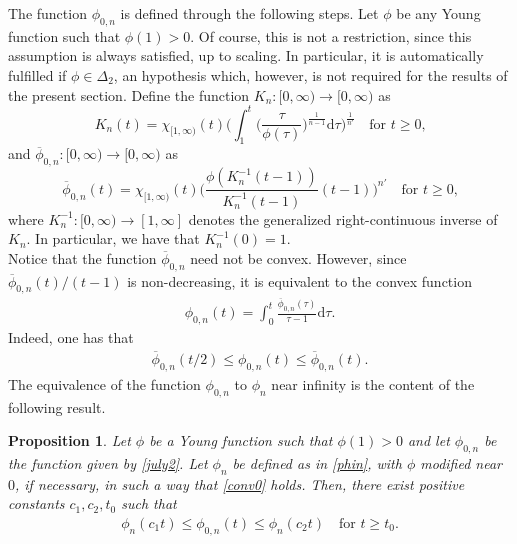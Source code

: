 \documentclass[leqno,11pt]{amsart}%
\numberwithin{equation}{section}
\def\d{\mathrm{d}}
\newtheorem{prop}[thm]{Proposition}
\theoremstyle{definition}
\numberwithin{equation}{section}
\begin{document}
The function $\phi_{0,n}$ is  defined through the following steps.
Let $\phi$ be any  Young function such that $\phi (1)>0$. Of course, this is not a restriction, since this assumption is always satisfied, up to scaling. In particular, it is automatically fulfilled if $\phi \in\Delta_2$, an hypothesis which, however, is not required for the results of the present section.
Define the function $K_n: [0, \infty) \to [0, \infty)$ as 
\begin{equation}
    \label{K}
    K_n(t)= \chi_{[1, \infty)}(t)\bigg(\int_1^t\Big(\frac \tau{\phi (\tau)}\Big)^{\frac{1}{n-1}}\d \tau\bigg)^{\frac 1{n'}} \quad \text{for $t \geq 0$,}
\end{equation}
and $\overline \phi_{0,n}: [0, \infty) \to [0, \infty)$
as
\begin{equation}
    \label{B}
    \overline \phi_{0,n}(t) = \chi_{[1, \infty)}(t)\bigg(\displaystyle\frac{\phi(K_n^{-1}(t-1))}{K_n^{-1}(t-1)}(t-1)\bigg)^{n'}\quad \text{for $t \geq 0$,}  
\end{equation}
where $K_n^{-1}: [0, \infty) \to [1, \infty]$ denotes the generalized right-continuous inverse of $K_n$. In particular,  we have  that $K_n^{-1}(0)=1$.
\\
Notice that the function $\overline \phi_{0,n}$ need not be convex.  However, since $\overline \phi_{0,n}(t)/(t-1)$ is non-decreasing, it is equivalent to the convex function \begin{align}
    \label{july2}
   \phi_{0,n}(t)= \int_0^t \frac{\overline \phi_{0,n}(\tau)}{\tau-1}\d \tau.
\end{align}
Indeed, one has that
\begin{align}
    \label{SP1}
 \overline \phi_{0,n}(t/2)  \leq   \phi_{0,n}(t)\leq  \overline \phi_{0,n}(t).
\end{align}
The equivalence of the function $\phi_{0,n}$ to $ \phi_{n}$ near infinity is the content of the following result.
\begin{prop}
    \label{equiv}
    Let $\phi$ be a Young function such that $\phi(1)>0$ and let  $ \phi_{0,n}$ be the function given by \eqref{july2}.
    Let
    $\phi_n$ be defined as in \eqref{phin},  with $\phi$ modified near $0$, if necessary, in such a way that \eqref{conv0} holds.
    Then, there exist positive constants $c_1, c_2, t_0$ such that
    \begin{align}
        \label{june10}
        \phi_n(c_1t) \leq  \phi_{0,n}(t) \leq \phi_n(c_2t) \quad \text{for $t\geq t_0$.}
    \end{align}
\end{prop}
\end{document}
